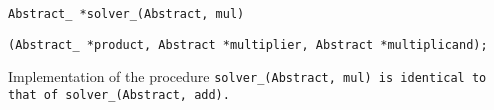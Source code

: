 
\s\tt{Abstract_ *solver_(Abstract, mul)}

\tt{(Abstract_ *product, Abstract *multiplier, Abstract *multiplicand);}


Implementation of the procedure \tt{solver_(Abstract, mul)}
is identical to that of \tt{solver_(Abstract, add)}.
